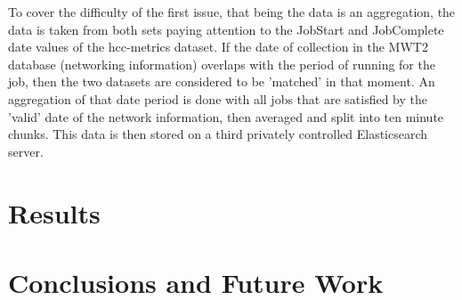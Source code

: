 \documentclass[]{scrartcl}
\begin{document}
To cover the difficulty of the first issue, that being the data is an aggregation, the data is taken from both sets paying attention to the JobStart and JobComplete date values of the hcc-metrics dataset. If the date of collection in the MWT2 database (networking information) overlaps with the period of running for the job, then the two datasets are considered to be 'matched' in that moment. An aggregation of that date period is done with all jobs that are satisfied by the 'valid' date of the network information, then averaged and split into ten minute chunks. This data is then stored on a third privately controlled Elasticsearch server.

\section{Results}

\section{Conclusions and Future Work}
\end{document}
